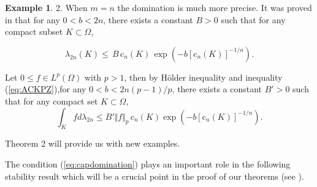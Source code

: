 \documentclass[12pt]{amsart}
\theoremstyle{definition}
\newtheorem{example}[theorem]{Example}
\numberwithin{theorem}{section}
\numberwithin{equation}{section}
\begin{document}
{\begin{example}
2. When $m=n$ the domination is much more precise. It was proved in  \cite{ACKPZ09} that for any $0< b < 2 n $, there exists a constant $B > 0$ such that for any compact subset $K \subset \Omega$, 
 
 \begin{equation} \label{eq:ACKPZ}
 \lambda_{2 n} (K) \leq  \, B \,  \text{c}_n (K) \,  \exp \left( -b \left[\text{c}_n (K)\right]^{- 1 \slash n}\right).
 \end{equation}


Let  $ 0 \leq f \in L^p (\Omega)$ with $p > 1$, then by H\"older inequality and inequality (\ref{eq:ACKPZ}),for any $0< b < 2 n (p-1) \slash p$, there exists a constant $B' > 0$ such that for any compact set $K \subset \Omega$, 
\begin{equation*} 
\int_K f d \lambda_{2 n} \leq  B' \Vert f\Vert_p  \,  \text{c}_n (K) \exp \left( -b \left[\text{c}_n (K)\right]^{- 1 \slash n}\right).
\end{equation*}
\end{example}

Theorem 2 will provide us with new examples.
 
 The condition (\ref{eq:capdomination}) plays an important role in the following stability result which will be a crucial point in the proof of our theorems (see \cite{EGZ09, GKZ08, Ch16a}).
 
 
}
\end{document}
